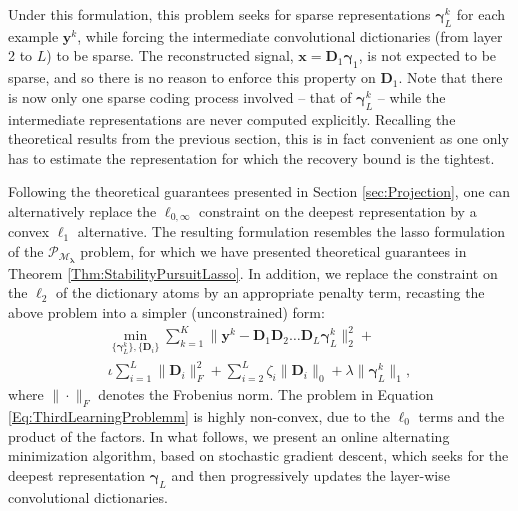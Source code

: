 \documentclass[10pt,journal]{IEEEtran}
\def\x{{\mathbf x}}
\def\y{{\mathbf y}}
\def\D{{\mathbf D}}
\def\M{{\mathcal{M}}}
\def\P{{\mathcal{P}}}
\def\gama{{\boldsymbol \gamma}}
\def\lamda{{\boldsymbol \lambda}}
\def\Loi{{\ell_{0,\infty}}}
\def\PM{{\P_{\M_\lamda}}}
\theoremstyle{plain}
\theoremstyle{definition}
\newtheorem{defn}[thm]{Definition} %
\begin{document}
Under this formulation, this problem seeks for sparse representations $\gama^k_L$ for each example $\y^k$, while forcing the intermediate convolutional dictionaries (from layer 2 to $L$) to be sparse. The reconstructed signal, $\x = \D_1\gama_1$, is not expected to be sparse, and so there is no reason to enforce this property on $\D_1$. Note that there is now only one sparse coding process involved -- that of $\gama^k_L$ -- while the intermediate representations are never computed explicitly. Recalling the theoretical results from the previous section, this is in fact convenient as one only has to estimate the representation for which the recovery bound is the tightest.

Following the theoretical guarantees presented in Section \ref{sec:Projection}, one can alternatively replace the $\Loi$ constraint on the deepest representation by a convex $\ell_1$ alternative. The resulting formulation resembles the lasso formulation of the $\PM$ problem, for which we have presented theoretical guarantees in Theorem \ref{Thm:StabilityPursuitLasso}. In addition, we replace the constraint on the $\ell_2$ of the dictionary atoms by an appropriate penalty term, recasting the above problem into a simpler (unconstrained) form: 
\begin{multline}
	\min_{\{\gama^k_L\},\{\D_i\}} \sum_{k=1}^K \| \y^k - \D_1\D_2\dots\D_L \gama^k_L \|^2_2 +\\ \iota \sum_{i=1}^L \|\D_i\|^2_F + \sum_{i=2}^L \zeta_i \|\D_i\|_0 + \lambda \|\gama^k_L\|_1,
\label{Eq:ThirdLearningProblemm}
\end{multline}
where $\|\cdot\|_F$ denotes the Frobenius norm.
The problem in Equation \eqref{Eq:ThirdLearningProblemm} is highly non-convex, due to the $\ell_0$ terms and the product of the factors. In what follows, we present an online alternating minimization algorithm, based on stochastic gradient descent, which seeks for the deepest representation $\gama_L$ and then progressively updates the layer-wise convolutional dictionaries.
\end{document}
